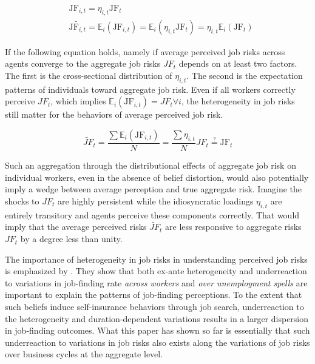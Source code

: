   \begin{equation}
  \label{eq:hetero_risks}
   \begin{split}
   &    \text{JF}_{i,t} = \eta_{i,t}\text{JF}_{t}  \\
&    \widetilde{\text{JF}_{i,t}} = \mathbb{E}_i(\text{JF}_{i,t})=\mathbb{E}_i(\eta_{i,t}\text{JF}_{t}) = \eta_{i,t} \mathbb{E}_i(\text{JF}_{t})
   \end{split}
   \end{equation}


If the following equation holds, namely if average perceived job risks across agents converge to the aggregate job risks $JF_t$ depends on at least two factors. The first is the cross-sectional distribution of $\eta_{i,t}$. The second is the expectation patterns of individuals toward aggregate job risk. Even if all workers correctly perceive ${JF}_t$, which implies $\mathbb{E}_i(\text{JF}_{i,t}) = {JF}_t \forall i$, the heterogeneity in job risks still matter for the behaviors of average perceived job risk.

\begin{equation}
  \widetilde{JF}_t = \frac{\sum     \mathbb{E}_i(\text{JF}_{i,t})}{N}=\frac{\sum \eta_{i,t}}{N}JF_t  \overset{?}{=}  \text{JF}_{t}
\end{equation}

Such an aggregation through the distributional effects of aggregate job risk on individual workers, even in the absence of belief distortion, would also potentially imply a wedge between average perception and true aggregate risk. Imagine the shocks to $JF_t$ are highly persistent while the idiosyncratic loadings $\eta_{i,t}$ are entirely transitory and agents perceive these components correctly. That would imply that the average perceived risks $\widetilde{JF}_t$ are less responsive to aggregate risks $JF_t$ by a degree less than unity. 

The importance of heterogeneity in job risks in understanding perceived job risks is emphasized by \cite{mueller2021job}.  They show that both ex-ante heterogeneity and underreaction to variations in job-finding rate \textit{across workers} and \textit{over unemployment spells} are important to explain the patterns of job-finding perceptions. To the extent that such beliefs induce self-insurance behaviors through job search, underreaction to the heterogeneity and duration-dependent variations results in a larger dispersion in job-finding outcomes. What this paper has shown so far is essentially that such underreaction to variations in job risks also exists along the variations of job risks over business cycles at the aggregate level. 

